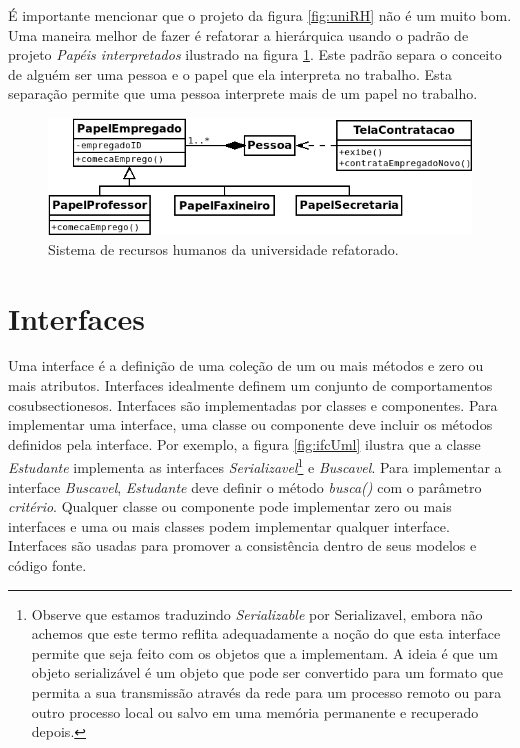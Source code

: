 \documentclass[
	11pt,				%
	openright,
	twoside,			%
	a4paper,			%
	english,			%
	french,
	brazil,				%
	sumario=tradicional
	]{abntex2}
\begin{document}
É importante mencionar que o projeto da figura \ref{fig:uniRH} não é um muito bom. Uma maneira melhor de fazer é refatorar a hierárquica usando o padrão de projeto \emph{Papéis interpretados} ilustrado na figura \ref{fig:uniRH2}. Este padrão separa o conceito de alguém ser uma pessoa e o papel que ela interpreta no trabalho. Esta separação permite que uma pessoa interprete mais de um papel no trabalho.

\begin{figure}
\begin{center}
\includegraphics[scale=0.65]{uniRH2.png}
\end{center}
\caption{Sistema de recursos humanos da universidade refatorado.} \label{fig:uniRH2}
\end{figure}

\section{Interfaces}

Uma interface é a definição de uma coleção de um ou mais métodos e zero ou mais atributos. Interfaces idealmente definem um conjunto de comportamentos cosubsectionesos. Interfaces são implementadas por classes e componentes. Para implementar uma interface, uma classe ou componente deve incluir os métodos definidos pela interface. Por exemplo, a figura \ref{fig:ifcUml} ilustra que a classe \emph{Estudante} implementa as interfaces \emph{Serializavel}\footnote{Observe que estamos traduzindo \emph{Serializable} por Serializavel, embora não achemos que este termo reflita adequadamente a noção do que esta interface permite que seja feito com os objetos que a implementam. A ideia é que um objeto serializável é um objeto que pode ser convertido para um formato que permita a sua transmissão através da rede para um processo remoto ou para outro processo local ou salvo em uma memória permanente e recuperado depois.} e \emph{Buscavel}. Para implementar a interface \emph{Buscavel}, \emph{Estudante} deve definir o método \emph{busca()} com o parâmetro \emph{critério}. Qualquer classe ou componente pode implementar zero ou mais interfaces e uma ou mais classes podem implementar qualquer interface. Interfaces são usadas para promover a consistência dentro de seus modelos e código fonte.
\end{document}
